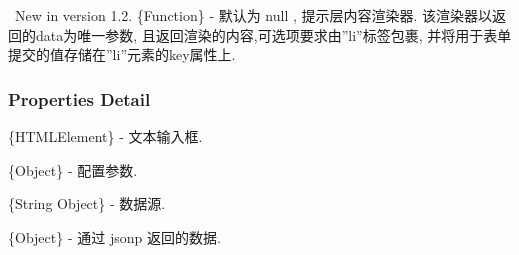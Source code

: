 \documentclass[letterpaper,10pt,english]{sphinxmanual}
\begin{document}

\begin{fulllineitems}
\label{api/component/suggest/index:Suggest.contentRender}~New in version 1.2.
\{Function\} - 默认为 null , 提示层内容渲染器. 该渲染器以返回的data为唯一参数, 且返回渲染的内容,可选项要求由''li''标签包裹, 并将用于表单提交的值存储在''li''元素的key属性上.

\end{fulllineitems}



\subsubsection{Properties Detail}
\label{api/component/suggest/index:properties-detail}

\begin{fulllineitems}
\label{api/component/suggest/index:Suggest.textInput}
\{HTMLElement\} - 文本输入框.

\end{fulllineitems}



\begin{fulllineitems}
\label{api/component/suggest/index:Suggest.config}
\{Object\} - 配置参数.

\end{fulllineitems}



\begin{fulllineitems}
\label{api/component/suggest/index:Suggest.dataSource}
\{String \textbar{} Object\} - 数据源.

\end{fulllineitems}



\begin{fulllineitems}
\label{api/component/suggest/index:Suggest.returnedData}
\{Object\} - 通过 jsonp 返回的数据.

\end{fulllineitems}
\end{document}
